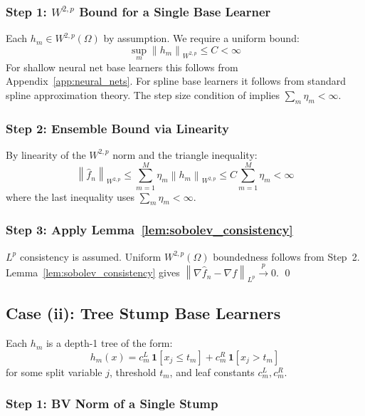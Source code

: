 \documentclass[12pt]{article}
\newcommand{\norm}[1]{\left\| #1 \right\|}
\newcommand{\Wtwop}{W^{2,p}(\Omega)}
\newcommand{\fn}{\hat{f}_n}
\newcommand{\xrightarrowp}{\xrightarrow{p}}
\begin{document}
	\subsubsection*{Step 1: $W^{2,p}$ Bound for a Single Base Learner}
	
	Each $h_m \in \Wtwop$ by assumption. We require a uniform bound:
	\begin{equation}
		\sup_m \norm{h_m}_{W^{2,p}} \leq C < \infty
	\end{equation}
	For shallow neural net base learners this follows from Appendix~\ref{app:neural_nets}.
	For spline base learners it follows from standard spline approximation theory.
	The step size condition of \citet{buhlmann2003boosting} implies
	$\sum_m \eta_m < \infty$.
	
	\subsubsection*{Step 2: Ensemble Bound via Linearity}
	
	By linearity of the $W^{2,p}$ norm and the triangle inequality:
	\begin{equation}
		\norm{\fn}_{W^{2,p}}
		\leq \sum_{m=1}^M \eta_m \norm{h_m}_{W^{2,p}}
		\leq C \sum_{m=1}^M \eta_m < \infty
	\end{equation}
	where the last inequality uses $\sum_m \eta_m < \infty$.
	
	\subsubsection*{Step 3: Apply Lemma~\ref{lem:sobolev_consistency}}
	
	$L^p$ consistency is assumed. Uniform $\Wtwop$ boundedness follows from Step~2.
	Lemma~\ref{lem:sobolev_consistency} gives
	$\norm{\nabla \fn - \nabla f}_{L^p} \xrightarrowp 0$. \qed
	
	\subsection{Case (ii): Tree Stump Base Learners}
	
	Each $h_m$ is a depth-1 tree of the form:
	\begin{equation}
		h_m(x) = c_m^L \,\mathbf{1}[x_j \leq t_m] + c_m^R \,\mathbf{1}[x_j > t_m]
	\end{equation}
	for some split variable $j$, threshold $t_m$, and leaf constants $c_m^L,
	c_m^R$.
	
	\subsubsection*{Step 1: BV Norm of a Single Stump}
	
\end{document}
